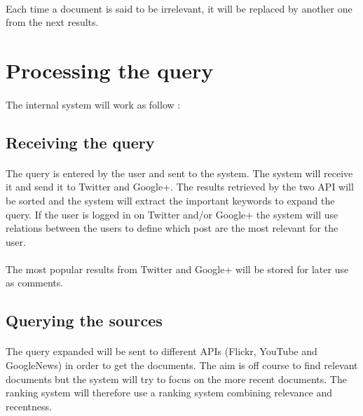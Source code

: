 \documentclass[english,7pt]{article}
\begin{document}
\paragraph{}Each time a document is said to be irrelevant, it will be replaced by another one from the next results.

\section{Processing the query}
\paragraph{}The internal system will work as follow : 

\subsection{Receiving the query}
\paragraph{}The query is entered by the user and sent to the system. The system will receive it and send it to Twitter and Google+. The results retrieved by the two API will be sorted and the system will extract the important keywords to expand the query. If the user is logged in on Twitter and/or Google+ the system will use relations between the users to define which post are the most relevant for the user.

\paragraph{}The most popular results from Twitter and Google+ will be stored for later use as comments.

\subsection{Querying the sources}
\paragraph{}The query expanded will be sent to different APIs (Flickr, YouTube and GoogleNews) in order to get the documents. The aim is off course to find relevant documents but the system will try to focus on the more recent documents. The ranking system will therefore use a ranking system combining relevance and recentness.
\end{document}
